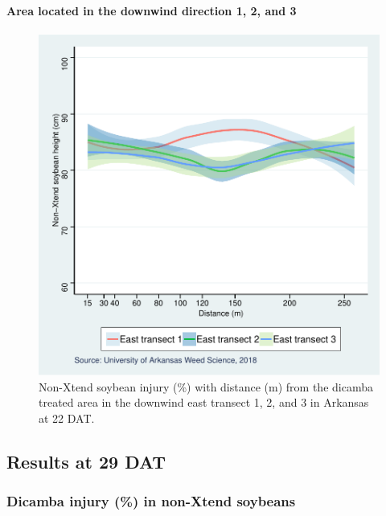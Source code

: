 \documentclass[]{article}
\let\oldparagraph\paragraph
\renewcommand{\paragraph}[1]{\oldparagraph{#1}\mbox{}}
\begin{document}
\paragraph{\texorpdfstring{Area located in the \textbf{downwind}
direction 1, 2, and
3}{Area located in the downwind direction 1, 2, and 3}}\label{area-located-in-the-downwind-direction-1-2-and-3}

\begin{figure}
\centering
\includegraphics{Report_Dicamba_study_files/figure-latex/unnamed-chunk-16-1.pdf}
\caption{Non-Xtend soybean injury (\%) with distance (m) from the
dicamba treated area in the downwind east transect 1, 2, and 3 in
Arkansas at 22 DAT.}
\end{figure}

\pagebreak
\newpage

\subsection{Results at 29 DAT}\label{results-at-29-dat}

\subsubsection{Dicamba injury (\%) in non-Xtend
soybeans}\label{dicamba-injury-in-non-xtend-soybeans-1}
\end{document}
